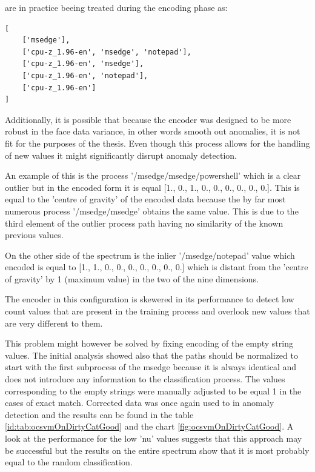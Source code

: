 \documentclass[a4paper,twoside,12pt]{book}
\begin{document}
are in practice beeing treated during the encoding phase as:

\begin{lstlisting}
[
	['msedge'],
	['cpu-z_1.96-en', 'msedge', 'notepad'],
	['cpu-z_1.96-en', 'msedge'],
	['cpu-z_1.96-en', 'notepad'],
	['cpu-z_1.96-en']
]
\end{lstlisting}

Additionally, it is possible that because the encoder was designed to be more robust in the face 
data variance, in other words smooth out anomalies, it is not fit for the purposes of the thesis. 
Even though this process allows for the handling of new values it might significantly disrupt anomaly detection.

An example of this is the process '/msedge/msedge/powershell' which is a clear outlier
but in the encoded form it is equal [1., 0., 1., 0., 0., 0., 0., 0., 0.]. This is equal
to the 'centre of gravity' of the encoded data because the by far most numerous process
'/msedge/msedge' obtains the same value. This is due to the third element of the outlier process  
path having no similarity of the known previous values.

On the other side of the spectrum is the inlier '/msedge/notepad' value which encoded is equal to
[1., 1., 0., 0., 0., 0., 0., 0., 0.] which is distant from the 'centre of gravity' by 1 (maximum 
value) in the two of the nine dimensions. 

The encoder in this configuration is skewered in its performance to detect low count values that
are present in the training process and overlook new values that are very different to them. 

This problem might however be solved by fixing encoding of the empty string values. The
initial analysis showed also that the paths should be normalized to start with the first 
subprocess of the msedge because it is always identical and does not introduce any information
to the classification process. The values corresponding to the empty strings were manually adjusted
to be equal 1 in the cases of exact match. Corrected data was once again used to in anomaly detection
and the results can be found in the table \ref{id:tab:ocsvmOnDirtyCatGood} and the chart \ref{fig:ocsvmOnDirtyCatGood}. 
A look at the performance for the low 'nu' values suggests that this approach may be successful but 
the results on the entire spectrum show that it is most probably equal to the random classification.
\end{document}
